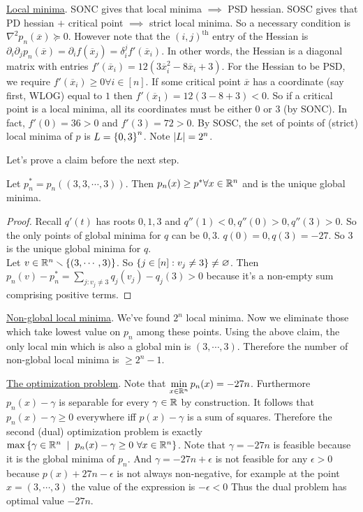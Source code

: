 \begin{enumerate}[label=(\alph*)]
\underline{Local minima}. SONC gives that local minima $\implies$ PSD hessian. SOSC gives that PD hessian $+$ critical point $\implies$ strict local minima. So a necessary condition is $\nabla^{2}p_{n}(\overline x)\succeq 0$. However note that the $(i,j)^{\text{th}}$ entry of the Hessian is $\partial_{i}\partial_{j}p_{n}(\overline x) = \partial_{i}f(\overline x_{j}) = \delta_{i}^{j}f'(\overline x_{i})$. In other words, the Hessian is a diagonal matrix with entries $f'(\overline x_{i}) = 12(3\overline x_{i}^{2}-8\overline x_{i}+3)$. For the Hessian to be PSD, we require $f'(\overline x_{i})\ge 0\forall i\in[n]$. If some critical point $\overline x$ has a coordinate (say first, WLOG) equal to $1$ then $f'(\overline x_{1}) = 12(3-8+3) < 0$. So if a critical point is a local minima, all its coordinates must be either $0$ or $3$ (by SONC). In fact, $f'(0) = 36 > 0$ and $f'(3) = 72 > 0$. By SOSC, the set of points of (strict) local minima of $p$ is $L = \left\{0,3\right\}^{n}$. Note $\left| L \right| = 2^{n}$. 

Let's prove a claim before the next step.
\begin{cl}
Let $p_{n}^{*} = p_{n}((3,3,\cdots,3))$. Then $p_{n}(x)\ge p^{*}\forall x\in\mathbb{R}^{n}$ and is the unique global minima.
\end{cl}
\begin{proof}
Recall $q'(t)$ has roots $0,1,3$ and $q''(1)<0,q''(0)>0, q''(3)>0$. So the only points of global minima for $q$ can be $0,3$. $q(0)=0, q(3)=-27$. So $3$ is the unique global minima for $q$. \\
Let $v\in\mathbb{R}^{n}\smallsetminus\left\{(3,\cdots,3)\right\}$. So $\left\{j\in[n]: v_{j}\ne 3\right\}\ne\varnothing$. Then $p_{n}(v) - p_{n}^{*} = \sum\limits_{j:v_{j} \ne 3 }q_{j}(v_{j})-q_{j}(3) > 0$ because it's a non-empty sum comprising positive terms.
\end{proof}


\underline{Non-global local minima}. We've found $2^{n}$ local minima. Now we eliminate those which take lowest value on $p_{n}$ among these points. Using the above claim, the only local min which is also a global min is $(3,\cdots,3)$. Therefore the number of non-global local minima is $\ge 2^{n}-1$.

\underline{The optimization problem}. Note that $\displaystyle\min_{x\in\mathbb{R}^{n}}p_{n}(x) = -27n$. Furthermore $p_{n}(x)-\gamma$ is separable for every $\gamma\in\mathbb{R}$ by construction. It follows that $p_{n}(x)-\gamma\ge 0$ everywhere iff $p(x)-\gamma$ is a sum of squares. Therefore the second (dual) optimization problem is exactly $\max\set{\gamma\in\R^{n}\st p_{n}(x)-\gamma \ge 0~\forall x\in\R^{n}}$. Note that $\gamma=-27n$ is feasible because it is the global minima of $p_{n}$. And $\gamma = -27n+\epsilon$ is not feasible for any $\epsilon>0$ because $p(x)+27n-\epsilon$ is not always non-negative, for example at the point $x=(3,\cdots,3)$ the value of the expression is $-\epsilon<0$ Thus the dual problem has optimal value $-27n$.


\end{enumerate}
